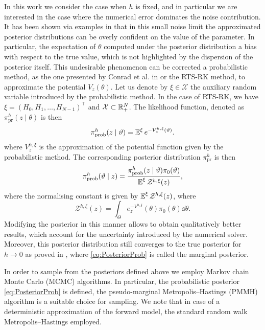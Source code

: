 \documentclass[10pt]{article}
\begin{document}
In this work we consider the case when $h$ is fixed, and in particular we are interested in the case where the numerical error dominates the noise contribution. It has been shown via examples in \cite{CGS17, COS17} that in this small noise limit the approximated posterior distributions can be overly confident on the value of the parameter. In particular, the expectation of $\theta$ computed under the posterior distribution  a bias with respect to the true value, which is not highlighted by the dispersion of the posterior itself. This undesirable phenomenon can be corrected  a probabilistic method, as the one presented by Conrad et al. in \cite{CGS17} or the RTS-RK method, to approximate the potential $V_z(\theta)$. Let us denote by $\xi \in \mathcal{X}$ the auxiliary random variable introduced by the probabilistic method. In the case of RTS-RK, we have $\xi = (H_0, H_1, \ldots, H_{N-1})^\top$ and $\mathcal{X} \subset \mathbb{R}_+^N$. The likelihood function, denoted as  $\pi^h_{\mathrm{pr}}(z\mid\theta)$ is then  
\begin{equation}\label{eq:LikelihoodProb}
	\pi^h_{\mathrm{prob}}(z\mid \vartheta) = \operatorname{\mathbb{E}}^\xi e^{-V^{h,\xi}_{z}(\vartheta)}.
\end{equation}
where $V^{h, \xi}_{z}$ is the approximation of the potential function given by the probabilistic method. The corresponding posterior distribution $\pi^h_{\mathrm{pr}}$ is then  
\begin{equation}\label{eq:PosteriorProb}
	\pi^h_{\mathrm{prob}}(\vartheta\mid z) = \frac{\pi^h_{\mathrm{prob}}(z\mid \vartheta)\pi_0(\vartheta)}{\operatorname{\mathbb{E}}^\xi \mathcal Z^{h, \xi}(z)},
\end{equation}
where the normalising constant is given by $\operatorname{\mathbb{E}}^\xi \mathcal Z^{h, \xi}(z)$, where
\begin{equation}
	\mathcal Z^{h, \xi}(z) = \int_{\Theta} e^{-V^{h,\xi}}_{z}(\theta) \pi_0(\theta) \dd \theta.
\end{equation}
Modifying the posterior in this manner allows to obtain qualitatively better results, which account for the uncertainty introduced by the numerical solver. Moreover, this posterior distribution still converges to the true posterior for $h \to 0$ as proved in \cite{LST18}, where \eqref{eq:PosteriorProb} is called the marginal posterior.

In order to sample from the posteriors defined above we employ Markov chain Monte Carlo (MCMC) algorithms. In particular,  the probabilistic posterior \eqref{eq:PosteriorProb} is defined, the pseudo-marginal Metropolis--Hastings (PMMH) algorithm \cite{AnR09} is a suitable choice for sampling. We note that in case of a deterministic approximation of the forward model, the standard random walk Metropolis--Hastings  employed.
\end{document}
